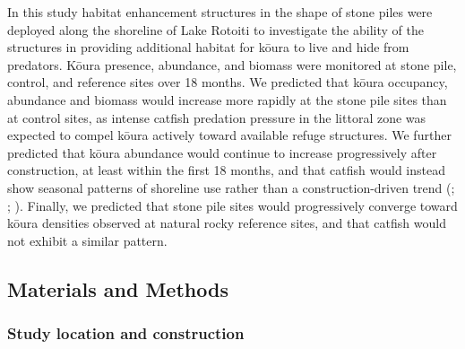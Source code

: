 \documentclass[
  letterpaper,
  DIV=11,
  numbers=noendperiod]{scrartcl}
\begin{document}
In this study habitat enhancement structures in the shape of stone piles
were deployed along the shoreline of Lake Rotoiti to investigate the
ability of the structures in providing additional habitat for kōura to
live and hide from predators. Kōura presence, abundance, and biomass
were monitored at stone pile, control, and reference sites over 18
months. We predicted that kōura occupancy, abundance and biomass would
increase more rapidly at the stone pile sites than at control sites, as
intense catfish predation pressure in the littoral zone was expected to
compel kōura actively toward available refuge structures. We further
predicted that kōura abundance would continue to increase progressively
after construction, at least within the first 18 months, and that
catfish would instead show seasonal patterns of shoreline use rather
than a construction-driven trend (; ;
). Finally, we predicted that
stone pile sites would progressively converge toward kōura densities
observed at natural rocky reference sites, and that catfish would not
exhibit a similar pattern.

\subsection{Materials and Methods}\label{materials-and-methods}

\subsubsection{Study location and
construction}\label{study-location-and-construction}
\end{document}
